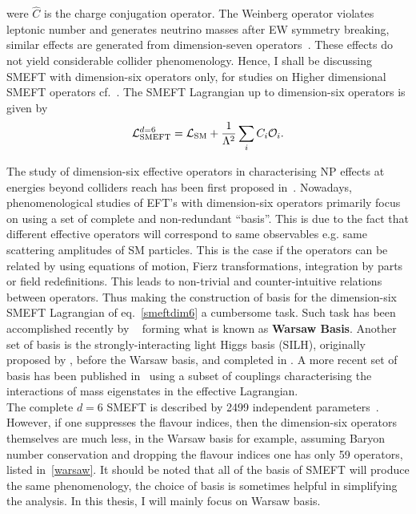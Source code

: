 were $\hat C$ is the charge conjugation operator. The Weinberg operator violates leptonic number and generates neutrino masses after EW symmetry breaking, similar effects are generated from dimension-seven operators~\cite{Lehman:2014jma}. These effects do not yield considerable collider phenomenology. Hence, I shall be discussing SMEFT with dimension-six operators only, for studies on Higher dimensional SMEFT operators cf.~\cite{Lehman:2014jma,Lehman:2015coa,Henning:2015alf,Aguilar-Saavedra:2010uur}.  The SMEFT Lagrangian up to dimension-six operators is given by
\begin{equation}
	\mathcal{L}_{\mathrm{SMEFT}}^{d=6}=\mathcal{L}_{\mathrm{SM}} + \frac{1}{\Lambda^2}\sum_i C_i  {\cal O}_i.
	\label{smeftdim6}
\end{equation}

The study of dimension-six effective operators in characterising NP effects at energies beyond colliders reach has been first proposed in~\cite{BUCHMULLER1986621,Hagiwara:1993ck}. Nowadays,  phenomenological studies of EFT's with dimension-six operators primarily focus on using a set of complete and non-redundant ``basis''. This is due to the fact that different effective operators will correspond to same observables e.g. same scattering amplitudes of SM particles.  This is the case if the operators can be related by using equations of motion, Fierz transformations, integration by parts or field redefinitions. This leads to non-trivial and counter-intuitive relations between operators. Thus making the construction of basis for the dimension-six SMEFT Lagrangian of eq.~\eqref{smeftdim6} a cumbersome task. Such task has been accomplished recently by ~\cite{Grzadkowski:2010es,Alonso:2013hga} forming what is known as \textbf{Warsaw Basis}.  Another set of basis is the strongly-interacting light Higgs basis (SILH), originally proposed by \cite{Giudice:2007fh}, before the Warsaw basis, and completed in \cite{Contino:2013kra, Elias-Miro:2013eta}. A more recent set of basis has been published in~\cite{Gupta:2014rxa} using a subset of couplings characterising the interactions of mass eigenstates in the effective Lagrangian.\\
The complete $d=6$ SMEFT is described by 2499 independent parameters~\cite{Alonso:2013hga}. However, if one suppresses the flavour indices, then the dimension-six operators themselves are much less, in the Warsaw basis for example, assuming Baryon number conservation and dropping the flavour indices one has only 59 operators, listed in~\autoref{warsaw}. It should be noted that all of the basis of SMEFT will produce the same phenomenology, the choice of basis is sometimes helpful in simplifying the analysis. In this thesis, I will mainly focus on Warsaw basis.\\ 
